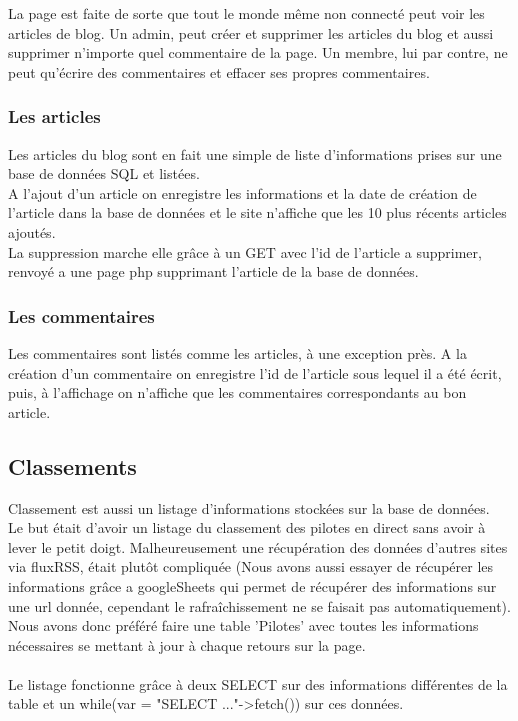 \documentclass{article}
\begin{document}
La page est faite de sorte que tout le monde même non connecté peut voir les articles de blog. Un admin, peut créer et supprimer les articles du blog et aussi supprimer n'importe quel commentaire de la page. Un membre, lui par contre, ne peut qu'écrire des commentaires et effacer ses propres commentaires.

\subsubsection{Les articles}
Les articles du blog sont en fait une simple de liste d'informations prises sur une base de données SQL et listées.\\
A l'ajout d'un article on enregistre les informations et la date de création de l'article dans la base de données et le site n'affiche que les 10 plus récents articles ajoutés.\\
La suppression marche elle grâce à un GET avec l'id de l'article a supprimer, renvoyé a une page php supprimant l'article de la base de données.

\subsubsection{Les commentaires}
Les commentaires sont listés comme les articles, à une exception près. A la création d'un commentaire on enregistre l'id de l'article sous lequel il a été écrit, puis, à l'affichage on n'affiche que les commentaires correspondants au bon article.

\subsection{Classements}
Classement est aussi un listage d'informations stockées sur la base de données.\\
Le but était d'avoir un listage du classement des pilotes en direct sans avoir à lever le petit doigt. Malheureusement une récupération des données d'autres sites via fluxRSS, était plutôt compliquée (Nous avons aussi essayer de récupérer les informations grâce a googleSheets qui permet de récupérer des informations sur une url donnée, cependant le rafraîchissement ne se faisait pas automatiquement).\\
Nous avons donc préféré faire une table 'Pilotes' avec toutes les informations nécessaires se mettant à jour à chaque retours sur la page.\\\\
Le listage fonctionne grâce à deux SELECT sur des informations différentes de la table et un while(var = "SELECT ..."->fetch()) sur ces données.
\end{document}
